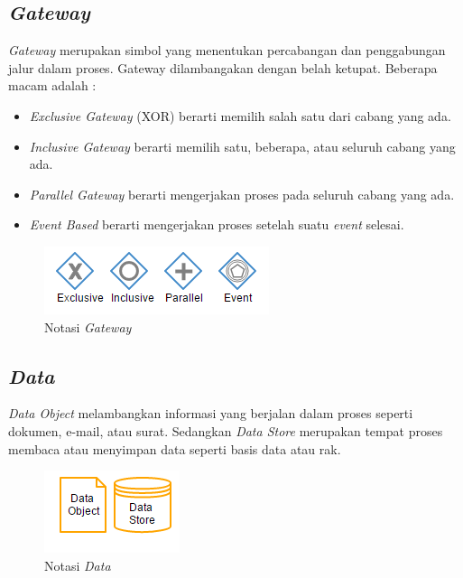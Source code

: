 \subsection{\textit{Gateway}}
\label{sec:gateway}
\textit{Gateway} merupakan simbol yang menentukan percabangan dan penggabungan jalur dalam proses. Gateway dilambangakan dengan belah ketupat. Beberapa macam adalah :
\begin{itemize}
	\item \textit{Exclusive Gateway} (XOR) berarti memilih salah satu dari cabang yang ada. 
	\item \textit{Inclusive Gateway} berarti memilih satu, beberapa, atau seluruh cabang yang ada.
	\item \textit{Parallel Gateway} berarti mengerjakan proses pada seluruh cabang yang ada.
	\item \textit{Event Based} berarti mengerjakan proses setelah suatu \textit{event} selesai.
\end{itemize} 

\begin{figure}[H]
	\centering
	\includegraphics[scale=1]{Gambar/Bab-2/bpmn/gateway}
	\caption{Notasi \textit{Gateway}} 
	\label{gateway}
\end{figure}




\subsection{\textit{Data}}
\label{sec:data}
\textit{Data Object} melambangkan informasi yang berjalan dalam proses seperti dokumen, e-mail, atau surat. Sedangkan \textit{Data Store} merupakan tempat proses membaca atau menyimpan data seperti basis data atau rak. 
\begin{figure}[H]
	\centering
	\includegraphics[scale=1]{Gambar/Bab-2/bpmn/data}
	\caption{Notasi \textit{Data}} 
	\label{data}
\end{figure}


